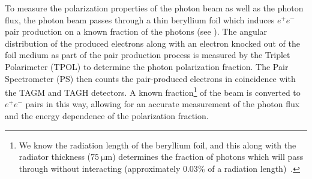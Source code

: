 To measure the polarization properties of the photon beam as well as the photon flux, the photon beam passes through a thin beryllium foil which induces $e^+e^-$ pair production on a known fraction of the photons (see ). The angular distribution of the produced electrons along with an electron knocked out of the foil medium as part of the pair production process is measured by the Triplet Polarimeter (TPOL) to determine the photon polarization fraction. The Pair Spectrometer (PS) then counts the pair-produced electrons in coincidence with the TAGM and TAGH detectors. A known fraction\footnote{We know the radiation length of the beryllium foil, and this along with the radiator thickness ($\SI{75}{\micro\meter}$) determines the fraction of photons which will pass through without interacting (approximately $0.03\%$ of a radiation length)~\cite{Adhikari2021}.} of the beam is converted to $e^+e^-$ pairs in this way, allowing for an accurate measurement of the photon flux and the energy dependence of the polarization fraction.

